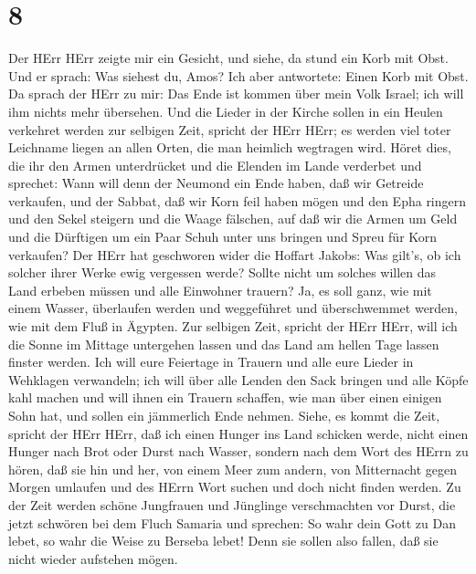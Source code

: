 \hypertarget{section-7}{%
\section{8}\label{section-7}}

 Der HErr HErr zeigte mir ein Gesicht, und siehe, da stund
ein Korb mit Obst.  Und er sprach: Was siehest du, Amos? Ich
aber antwortete: Einen Korb mit Obst. Da sprach der HErr zu mir: Das
Ende ist kommen über mein Volk Israel; ich will ihm nichts mehr
übersehen.  Und die Lieder in der Kirche sollen in ein
Heulen verkehret werden zur selbigen Zeit, spricht der HErr HErr; es
werden viel toter Leichname liegen an allen Orten, die man heimlich
wegtragen wird.  Höret dies, die ihr den Armen unterdrücket
und die Elenden im Lande verderbet  und sprechet: Wann will
denn der Neumond ein Ende haben, daß wir Getreide verkaufen, und der
Sabbat, daß wir Korn feil haben mögen und den Epha ringern und den Sekel
steigern und die Waage fälschen,  auf daß wir die Armen um
Geld und die Dürftigen um ein Paar Schuh unter uns bringen und Spreu für
Korn verkaufen?  Der HErr hat geschworen wider die Hoffart
Jakobs: Was gilt's, ob ich solcher ihrer Werke ewig vergessen werde?
 Sollte nicht um solches willen das Land erbeben müssen und
alle Einwohner trauern? Ja, es soll ganz, wie mit einem Wasser,
überlaufen werden und weggeführet und überschwemmet werden, wie mit dem
Fluß in Ägypten.  Zur selbigen Zeit, spricht der HErr HErr,
will ich die Sonne im Mittage untergehen lassen und das Land am hellen
Tage lassen finster werden.  Ich will eure Feiertage in
Trauern und alle eure Lieder in Wehklagen verwandeln; ich will über alle
Lenden den Sack bringen und alle Köpfe kahl machen und will ihnen ein
Trauern schaffen, wie man über einen einigen Sohn hat, und sollen ein
jämmerlich Ende nehmen.  Siehe, es kommt die Zeit, spricht
der HErr HErr, daß ich einen Hunger ins Land schicken werde, nicht einen
Hunger nach Brot oder Durst nach Wasser, sondern nach dem Wort des HErrn
zu hören,  daß sie hin und her, von einem Meer zum andern,
von Mitternacht gegen Morgen umlaufen und des HErrn Wort suchen und doch
nicht finden werden.  Zu der Zeit werden schöne Jungfrauen
und Jünglinge verschmachten vor Durst,  die jetzt schwören
bei dem Fluch Samaria und sprechen: So wahr dein Gott zu Dan lebet, so
wahr die Weise zu Berseba lebet! Denn sie sollen also fallen, daß sie
nicht wieder aufstehen mögen.

